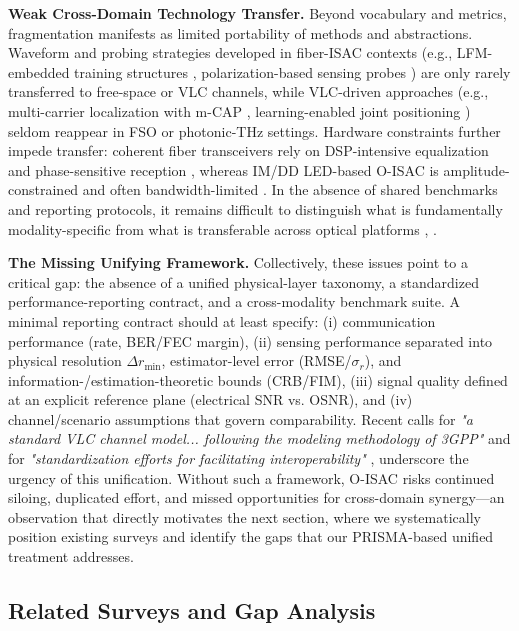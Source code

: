 \textbf{Weak Cross-Domain Technology Transfer.} Beyond vocabulary and metrics, fragmentation manifests as limited portability of methods and abstractions. Waveform and probing strategies developed in fiber-ISAC contexts (e.g., LFM-embedded training structures \cite{O_ISAC_042}, polarization-based sensing probes \cite{O_ISAC_074}) are only rarely transferred to free-space or VLC channels, while VLC-driven approaches (e.g., multi-carrier localization with m-CAP \cite{O_ISAC_022}, learning-enabled joint positioning \cite{O_ISAC_039}) seldom reappear in FSO or photonic-THz settings. Hardware constraints further impede transfer: coherent fiber transceivers rely on DSP-intensive equalization and phase-sensitive reception \cite{O_ISAC_033}, whereas IM/DD LED-based O-ISAC is amplitude-constrained and often bandwidth-limited \cite{O_ISAC_054}. In the absence of shared benchmarks and reporting protocols, it remains difficult to distinguish what is fundamentally modality-specific from what is transferable across optical platforms \cite{O_ISAC_068}, \cite{O_ISAC_067}.

\textbf{The Missing Unifying Framework.} Collectively, these issues point to a critical gap: the absence of a unified physical-layer taxonomy, a standardized performance-reporting contract, and a cross-modality benchmark suite. A minimal reporting contract should at least specify: (i) communication performance (rate, BER/FEC margin), (ii) sensing performance separated into physical resolution $\Delta r_{\min}$, estimator-level error (RMSE/$\sigma_r$), and information-/estimation-theoretic bounds (CRB/FIM), (iii) signal quality defined at an explicit reference plane (electrical SNR vs. OSNR), and (iv) channel/scenario assumptions that govern comparability. Recent calls for \textit{"a standard VLC channel model... following the modeling methodology of 3GPP"} \cite{O_ISAC_327} and for \textit{"standardization efforts for facilitating interoperability"} \cite{O_ISAC_068}, \cite{O_ISAC_082} underscore the urgency of this unification. Without such a framework, O-ISAC risks continued siloing, duplicated effort, and missed opportunities for cross-domain synergy---an observation that directly motivates the next section, where we systematically position existing surveys and identify the gaps that our PRISMA-based unified treatment addresses.

\subsection{Related Surveys and Gap Analysis}

